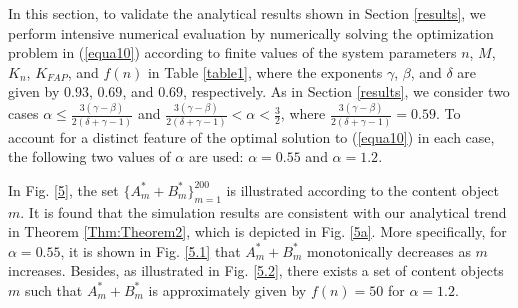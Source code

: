 \documentclass[10pt,journal,compsoc,onecolumn]{IEEEtran}
\begin{document}
In this section, to validate the analytical results shown in
Section \ref{results}, we perform intensive numerical evaluation
by numerically solving the optimization problem in (\ref{equa10})
according to finite values of the system parameters $n$, $M$,
$K_n$, $K_{FAP}$, and $f(n)$ in Table \ref{table1}, where the
exponents $\gamma$, $\beta$, and $\delta$ are given by $0.93$,
$0.69$, and $0.69$, respectively. As in Section \ref{results}, we
consider two cases $\alpha \leq
\frac{3(\gamma-\beta)}{2(\delta+\gamma-1)}$ and
$\frac{3(\gamma-\beta)}{2(\delta+\gamma-1)}< \alpha<\frac{3}{2}$,
where $\frac{3(\gamma-\beta)}{2(\delta+\gamma-1)}=0.59$. To
account for a distinct feature of the optimal solution to
(\ref{equa10}) in each case, the following two values of $\alpha$
are used: $\alpha =0.55$  and $\alpha =1.2$.

In Fig. \ref{5}, the set $\lbrace A_m^*+B_m^*\rbrace_{m=1}^{200}$
is illustrated according to the content object $m$. It is found
that the simulation results are consistent with our analytical
trend in Theorem \ref{Thm:Theorem2}, which is depicted in Fig. \ref{5a}.
More specifically, for $\alpha =0.55$, it is shown in Fig.
\ref{5.1} that $A_m^*+B_m^*$ monotonically decreases as $m$
increases. Besides, as illustrated in Fig. \ref{5.2}, there exists
a set of content objects $m$ such that $A_m^*+B_m^*$ is
approximately given by $f(n)=50$ for $\alpha =1.2$.
\end{document}
